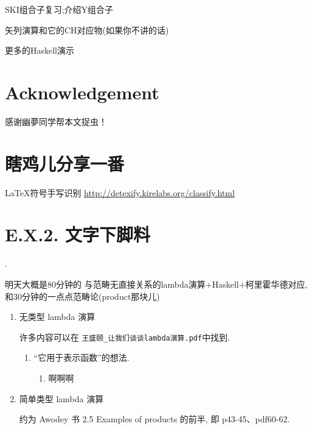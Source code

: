 \documentclass{article}
\begin{document}
SKI组合子复习;介绍Y组合子

矢列演算和它的CH对应物(如果你不讲的话)

更多的Haskell演示

\section{Acknowledgement}

感谢幽夢同学帮本文捉虫！

\section*{瞎鸡儿分享一番}

\LaTeX 符号手写识别 \url{http://detexify.kirelabs.org/classify.html}

\section*{E.X.2. 文字下脚料}
.

明天大概是80分钟的 与范畴无直接关系的lambda演算+Haskell+柯里霍华德对应, 
和30分钟的一点点范畴论(product那块儿)

\begin{enumerate}
	\item 无类型 lambda 演算
	
	许多内容可以在 \verb!王盛颐_让我们谈谈lambda演算.pdf!中找到.
	\begin{enumerate}
		\item “它用于表示函数”的想法. 
		\begin{enumerate}
			\item 啊啊啊
		\end{enumerate}
	\end{enumerate}
	
	
	\item 简单类型 lambda 演算
	
	约为 Awodey 书 2.5 Examples of products 的前半, 即 p43-45、pdf60-62.
\end{enumerate}	
\end{document}
